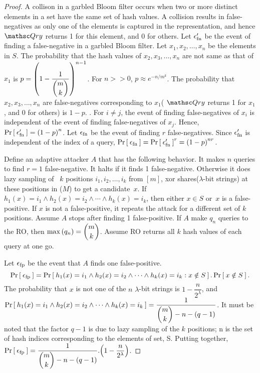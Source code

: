 \begin{proof}%
A collison in a garbled Bloom filter occurs when two or more distinct elements in a set have the same set of hash values. A collision results in false-negatives as only one of the elements is captured in the representation, and hence $\Qry$ returns 1 for this element, and 0 for others. Let $\epsilon_{\mathrm{fn}}'$ be the event of finding a false-negative in a garbled Bloom filter.  Let $x_1,x_2,\ldots,x_n$ be the elements in $S$. The probability that the hash values of $x_2,x_3,\ldots,x_n$ are not same as that of $x_1$ is $p = \left( 1-\dfrac{1}{\dbinom{m}{k}} \right)^{n-1}$. For $n >> 0$, $p \approx  e^{-n/m^k}$. The probability that $x_2,x_3,\ldots,x_n$ are false-negatives corresponding to $x_1$( $\Qry$ returns 1 for $x_1$, and 0 for others) is $1-p$. %
. For $i \neq j$, the event of finding false-negatives of $x_i$ is independent of the event of finding false-negatives of $x_j$. Hence, $\Pr\left[\: \epsilon_{\mathrm{fn}}' \:\right] = \left( 1-p \right)^n$. Let $\epsilon_{\mathrm{fn}}$ be the event of finding $r$ false-negatives. Since $\epsilon_{\mathrm{fn}}'$ is independent of the index of a query, $\Pr\left[\: \epsilon_{\mathrm{fn}} \:\right] = \Pr\left[\: \epsilon_{\mathrm{fn}}' \:\right]^{r} = \left( 1-p \right)^{nr}$.

Define an adaptive attacker $A$ that has the following behavior. It makes $n$ queries to find $r=1$ false-negative. It halts if it finds 1 false-negative. Otherwise it does lazy sampling of ~$k$ positions $i_1,i_2,\ldots,i_k$ from $[m]$, xor shares($\lambda$-bit strings) at these positions in ($M$) to get a candidate~$x$.  If $h_{1}(x)=i_1 \wedge h_2(x)=i_2 \wedge \cdots \wedge h_k(x) = i_k$, then either $x \in S$ or~$x$ is a false-positive. If $x$ is not a false-positive, it repeats the attack for a different set of $k$ positions. Assume $A$ stops after finding 1 false-positive. If $A$ make $q_n$ queries to the RO, then $\max\left(q_n\right) = \dbinom{m}{k}$. Assume RO returns all $k$ hash values of each query at one go.

Let $\epsilon_{\mathrm{fp}}$ be the event that $A$ finds one false-positive. 
 $$\Pr\left[\: \epsilon_{\mathrm{fp}} \:\right] = \Pr\left[\: h_{1}(x)=i_1 \wedge h_2(x)=i_2 \wedge \cdots \wedge h_k(x) = i_k : x \notin S \:\right].\Pr\left[\: x \notin S \:\right].$$
 The probability that $x$ is not one of the $n$ $\lambda$-bit strings is $1-\dfrac{n}{2^\lambda}$, and $ \Pr\left[\: h_{1}(x)=i_1 \wedge h_2(x)=i_2 \wedge \cdots \wedge\\ h_k(x) = i_k \:\right] = \dfrac{1}{\dbinom{m}{k}-n-(q-1)}$. It must be noted that the factor $q-1$ is due to lazy sampling of the $k$ positions; n is the set of hash indices corresponding to the elements of set, S. Putting together, $\Pr\left[\: \epsilon_{\mathrm{fp}} \:\right] =  \dfrac{1}{\dbinom{m}{k}-n-(q-1)} . \Big(1-\dfrac{n}{2^\lambda}\Big)$. 


\end{proof}

